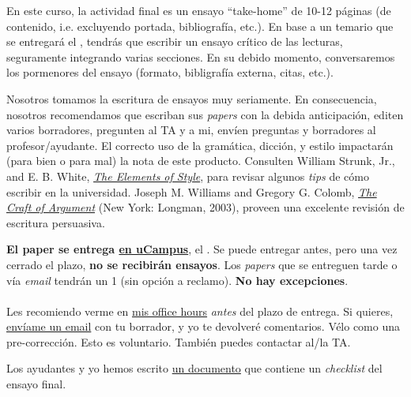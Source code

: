 \documentclass[letterpaper]{article}
\renewenvironment{itemize}{
  \begin{list}{}{
    \setlength{\leftmargin}{1.5em}
  }
}{
  \end{list}
}
\begin{document}
\begin{enumerate}
En este curso, la actividad final es un ensayo ``take-home'' de 10-12 p\'aginas (de contenido, i.e. excluyendo portada, bibliograf\'ia, etc.). En base a un temario que se entregar\'a el {\unskip}, tendr\'as que escribir un ensayo cr\'itico de las lecturas, seguramente integrando varias secciones. {\color{red}En su debido momento, conversaremos los pormenores del ensayo (formato, bibligraf\'ia externa, citas, etc.)}. 



	\begin{itemize}
		\item[\Pointinghand] Nosotros tomamos la escritura de ensayos muy seriamente. En consecuencia, nosotros recomendamos que escriban sus \emph{papers} con la debida anticipaci\'on, editen varios borradores, pregunten al TA y a mi, env\'ien preguntas y borradores al profesor/ayudante. El correcto uso de la gram\'atica, dicci\'on, y estilo impactar\'an (para bien o para mal) la nota de este producto. Consulten William Strunk, Jr., and E. B. White, \href{http://www.jlakes.org/ch/web/The-elements-of-style.pdf}{\emph{The Elements of Style}}, para revisar algunos \emph{tips} de c\'omo escribir en la universidad. Joseph M. Williams and Gregory G. Colomb, \href{http://sir.spbu.ru/en/programs/master/master_program_in_international_relations/digital_library/Book%20Research%20seminar%20by%20Booth.pdf}{\emph{The Craft of Argument}} (New York: Longman, 2003), proveen una excelente revisi\'on de escritura persuasiva.
	\end{itemize}


	{\bf El paper se entrega \underline{en uCampus}}, el {\bf {\unskip}}. Se puede entregar antes, pero una vez cerrado el plazo, {\bf no se recibir\'an ensayos}. Los \emph{papers} que se entreguen tarde o v\'ia \emph{email} tendr\'an un 1 (sin opci\'on a reclamo). {\bf No hay excepciones}. 
	\\
	\\
	Les recomiendo verme en \href{https://calendly.com/bahamonde/officehours}{mis office hours} \emph{antes} del plazo de entrega. Si quieres, \href{mailto:\filetext}{env\'iame un email} con tu borrador, y yo te devolver\'e comentarios. V\'elo como una pre-correcci\'on. Esto es voluntario. Tambi\'en puedes contactar al/la TA. 

	\begin{itemize}
		\item[\Pointinghand] Los ayudantes y yo hemos escrito \href{https://github.com/hbahamonde/Intro_Ciencias_Sociales/raw/master/Ensayo_Final/Bahamonde_Ensayo_Checklist.pdf}{un documento} que contiene un \emph{checklist} del ensayo final.
	\end{itemize}

\end{enumerate}
\end{document}

